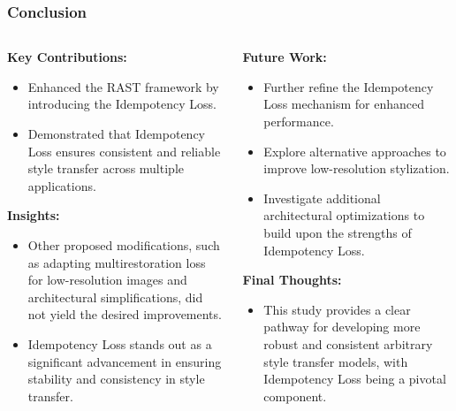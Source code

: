 \begin{frame}
\frametitle{Conclusion}

\begin{columns}
    \begin{column}{0.5\textwidth}
        \textbf{Key Contributions:}
        \begin{itemize}
            \item Enhanced the RAST framework by introducing the Idempotency Loss.
            \item Demonstrated that Idempotency Loss ensures consistent and reliable style transfer across multiple applications.
        \end{itemize}
        
        \textbf{Insights:}
        \begin{itemize}
            \item Other proposed modifications, such as adapting multirestoration loss for low-resolution images and architectural simplifications, did not yield the desired improvements.
            \item Idempotency Loss stands out as a significant advancement in ensuring stability and consistency in style transfer.
        \end{itemize}
    \end{column}
    
    \begin{column}{0.5\textwidth}
        \textbf{Future Work:}
        \begin{itemize}
            \item Further refine the Idempotency Loss mechanism for enhanced performance.
            \item Explore alternative approaches to improve low-resolution stylization.
            \item Investigate additional architectural optimizations to build upon the strengths of Idempotency Loss.
        \end{itemize}
        
        \textbf{Final Thoughts:}
        \begin{itemize}
            \item This study provides a clear pathway for developing more robust and consistent arbitrary style transfer models, with Idempotency Loss being a pivotal component.
        \end{itemize}
    \end{column}
\end{columns}

\end{frame}
